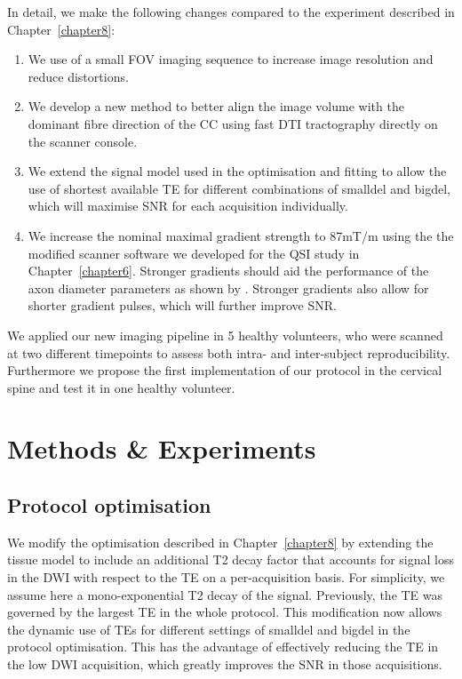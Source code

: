 In detail, we make the following changes compared to the \SFasym{} experiment described in Chapter~\ref{chapter8}:
\begin{enumerate}
\item We use of a small \gls{FOV} imaging sequence to increase image resolution and reduce distortions.
\item We develop a new method to better align the image volume with the dominant fibre direction of the \gls{CC} using fast DTI tractography directly on the scanner console.
\item We extend the signal model used in the optimisation and fitting to allow the use of shortest available \gls{TE} for different combinations of \gls{smalldel} and \gls{bigdel}, which will maximise \gls{SNR} for each acquisition individually.
\item We increase the nominal maximal gradient strength to 87mT/m using the the modified scanner software we developed for the QSI study in Chapter~\ref{chapter6}. Stronger gradients should aid the performance of the axon diameter parameters as shown by \citet{Dyrby:2010}. Stronger gradients also allow for shorter gradient pulses, which will further improve \gls{SNR}.
\end{enumerate}
We applied our new imaging pipeline in 5 healthy volunteers, who were scanned at two different timepoints to assess both intra- and inter-subject reproducibility. Furthermore we propose the first implementation of our \SFasym{} protocol in the cervical spine and test it in one healthy volunteer. 


\section{Methods \& Experiments}
\subsection*{Protocol optimisation}
We modify the \SFasym{} optimisation described in Chapter~\ref{chapter8} by extending the tissue model to include an additional T2 decay factor that accounts for signal loss in the DWI with respect to the \gls{TE} on a per-acquisition basis. For simplicity, we assume here a mono-exponential T2 decay of the signal. Previously, the \gls{TE} was governed by the largest TE in the whole protocol. This modification now allows the dynamic use of \glspl{TE} for different settings of \gls{smalldel} and \gls{bigdel} in the protocol optimisation. This has the advantage of effectively reducing the \gls{TE} in the low DWI acquisition, which greatly improves the \gls{SNR} in those acquisitions.

